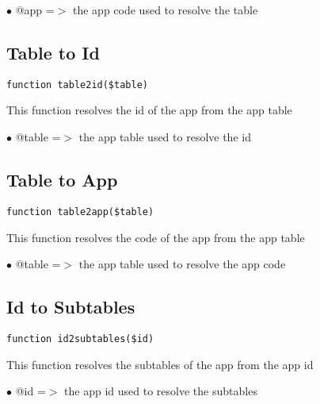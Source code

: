 \documentclass[a4paper]{book}
\begin{document}
\begin{compactitem}
\item[\color{myblue}$\bullet$] @app =$>$ the app code used to resolve the table
\end{compactitem}

\hypertarget{toc25}{}
\subsection{Table to Id}

\begin{lstlisting}
function table2id($table)
\end{lstlisting}

This function resolves the id of the app from the app table

\begin{compactitem}
\item[\color{myblue}$\bullet$] @table =$>$ the app table used to resolve the id
\end{compactitem}

\hypertarget{toc26}{}
\subsection{Table to App}

\begin{lstlisting}
function table2app($table)
\end{lstlisting}

This function resolves the code of the app from the app table

\begin{compactitem}
\item[\color{myblue}$\bullet$] @table =$>$ the app table used to resolve the app code
\end{compactitem}

\hypertarget{toc27}{}
\subsection{Id to Subtables}

\begin{lstlisting}
function id2subtables($id)
\end{lstlisting}

This function resolves the subtables of the app from the app id

\begin{compactitem}
\item[\color{myblue}$\bullet$] @id =$>$ the app id used to resolve the subtables
\end{compactitem}
\end{document}
